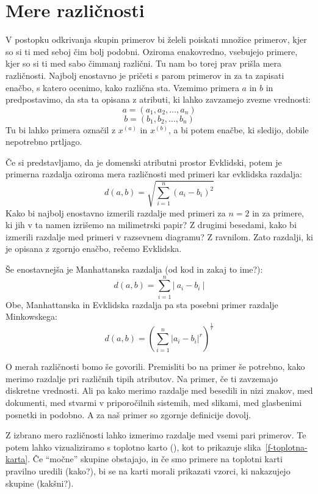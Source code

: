 \section{Mere različnosti}

V postopku odkrivanja skupin primerov bi želeli poiskati množice
primerov, kjer so si ti med seboj čim bolj podobni. Oziroma
enakovredno, vsebujejo primere, kjer so si ti med sabo čimmanj
različni. Tu nam bo torej prav prišla mera različnosti. Najbolj
enostavno je pričeti s parom primerov in za ta zapisati enačbo, s
katero ocenimo, kako različna sta. Vzemimo primera $a$ in $b$ in
predpostavimo, da sta ta opisana z atributi, ki lahko zavzamejo zvezne
vrednosti:
%
$$ a = (a_1,a_2, \ldots, a_n) $$
$$ b = (b_1,b_2, \ldots, b_n) $$
%
Tu bi lahko primera označil z $x^{(a)}$ in $x^{(b)}$, a bi potem
enačbe, ki sledijo, dobile nepotrebno prtljago.

Če si predstavljamo, da je domenski atributni prostor Evklidski, potem
je primerna razdalja oziroma mera različnosti med primeri kar
evklidska razdalja:
$$ d(a,b)=\sqrt{\sum_{i=1}^n(a_i-b_i)^2} $$ 
%
Kako bi najbolj enostavno izmerili razdalje med primeri za $n=2$ in za
primere, ki jih v ta namen izrišemo na milimetrski papir? Z drugimi
besedami, kako bi izmerili razdalje med primeri v razsevnem diagramu?
Z ravnilom. Zato razdalji, ki je opisana z zgornjo enačbo, rečemo
Evklidska.

Še enostavnejša je Manhattanska razdalja (od kod in zakaj to ime?):
$$ d(a,b)={\sum_{i=1}^n|\ a_i-b_i\ |} $$
Obe, Manhattanska in Evklidska razdalja pa sta posebni primer razdalje
Minkowskega:
$$ d(a,b)=({\sum_{i=1}^n|a_i-b_i|^r})^{\frac{1}{r}} $$

O merah različnosti bomo še govorili. Premisliti bo na primer še
potrebno, kako merimo razdalje pri različnih tipih atributov. Na
primer, če ti zavzemajo diskretne vrednosti. Ali pa kako merimo
razdalje med besedili in nizi znakov, med dokumenti, med stvarmi v
priporočilnih sistemih, med slikami, med glasbenimi posnetki in
podobno. A za naš primer so zgornje definicije dovolj.

Z izbrano mero različnosti lahko izmerimo razdalje med vsemi
pari primerov. Te potem lahko vizualiziramo s toplotno karto
(), kot to prikazuje slika~\ref{f-toplotna-karta}. Če
``močne'' skupine obstajajo, in če smo primere na toplotni karti
pravilno uredili (kako?), bi se na karti morali prikazati vzorci, ki
nakazujejo skupine (kakšni?).

